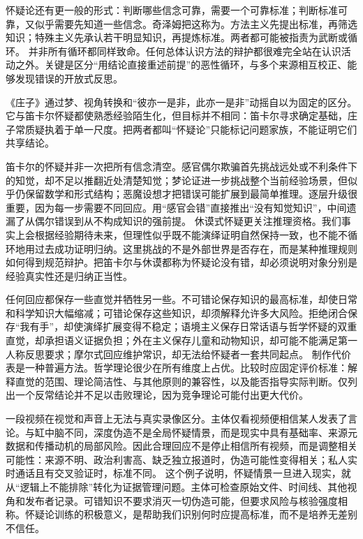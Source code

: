 怀疑论还有更一般的形式：判断哪些信念可靠，需要一个可靠标准；判断标准可靠，又似乎需要先知道一些信念。奇泽姆把这称为。方法主义先提出标准，再筛选知识；特殊主义先承认若干明显知识，再提炼标准。两者都可能被指责为武断或循环。 并非所有循环都同样致命。任何总体认识方法的辩护都很难完全站在认识活动之外。关键是区分“用结论直接重述前提”的恶性循环，与多个来源相互校正、能够发现错误的开放式反思。

\begin{comparison}
《庄子》通过梦、视角转换和“彼亦一是非，此亦一是非”动摇自以为固定的区分\parencite[chap.~2]{zhuangzi2009}。它与笛卡尔怀疑都使熟悉经验陌生化，但目标并不相同：笛卡尔寻求确定基础，庄子常质疑执着于单一尺度。把两者都叫“怀疑论”只能标记问题家族，不能证明它们共享结论。
\end{comparison}

笛卡尔的怀疑并非一次把所有信念清空。感官偶尔欺骗首先挑战远处或不利条件下的知觉，却不足以推翻近处清楚知觉；梦论证进一步挑战整个当前经验场景，但似乎仍保留数学和形式结构；恶魔设想才把错误可能扩展到最简单推理\parencite{descartes1996}。逐层升级很重要，因为每一步需要不同回应。用“感官会错”直接推出“没有知觉知识”，中间遗漏了从偶尔错误到从不构成知识的强前提。 休谟式怀疑更关注推理资格。我们事实上会根据经验期待未来，但理性似乎既不能演绎证明自然保持一致，也不能不循环地用过去成功证明归纳\parencite[sec.~4]{hume2000}。这里挑战的不是外部世界是否存在，而是某种推理规则如何得到规范辩护。把笛卡尔与休谟都称为怀疑论没有错，却必须说明对象分别是经验真实性还是归纳正当性。

任何回应都保存一些直觉并牺牲另一些。不可错论保存知识的最高标准，却使日常和科学知识大幅缩减；可错论保存这些知识，却须解释允许多大风险。拒绝闭合保存“我有手”，却使演绎扩展变得不稳定；语境主义保存日常话语与哲学怀疑的双重直觉，却承担语义证据负担；外在主义保存儿童和动物知识，却可能不能满足第一人称反思要求；摩尔式回应维护常识，却无法给怀疑者一套共同起点。 制作代价表是一种普遍方法。哲学理论很少在所有维度上占优。比较时应固定评价标准：解释直觉的范围、理论简洁性、与其他原则的兼容性，以及能否指导实际判断。仅列出一个反常结论并不足以击败理论，因为竞争理论可能付出更大代价。

一段视频在视觉和声音上无法与真实录像区分。主体仅看视频便相信某人发表了言论。与缸中脑不同，深度伪造不是全局怀疑情景，而是现实中具有基础率、来源元数据和传播动机的局部风险。因此合理回应不是停止相信所有视频，而是调整相关可能性：来源不明、政治利害高、缺乏独立报道时，伪造可能性变得相关；私人实时通话且有交叉验证时，标准不同。 这个例子说明，怀疑情景一旦进入现实，就从“逻辑上不能排除”转化为证据管理问题。主体可检查原始文件、时间线、其他视角和发布者记录。可错知识不要求消灭一切伪造可能，但要求风险与核验强度相称。怀疑论训练的积极意义，是帮助我们识别何时应提高标准，而不是培养无差别不信任。
